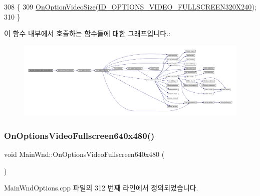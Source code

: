 \begin{DoxyCode}
308 \{
309   \mbox{\hyperlink{class_main_wnd_a3db1b6ad5af63ac2c3476868c015f6aa}{OnOptionVideoSize}}(\mbox{\hyperlink{resource_8h_ab637f5c65bbe48ce43c512478daa1491}{ID\_OPTIONS\_VIDEO\_FULLSCREEN320X240}});
310 \}
\end{DoxyCode}
이 함수 내부에서 호출하는 함수들에 대한 그래프입니다.\+:
\nopagebreak
\begin{figure}[H]
\begin{center}
\leavevmode
\includegraphics[width=350pt]{class_main_wnd_a6cdf116ca046f531f38d3d4ecb506f93_cgraph}
\end{center}
\end{figure}
\mbox{\label{class_main_wnd_ae205b52e438eb0305310ca81436967db}} 
\subsubsection{\texorpdfstring{On\+Options\+Video\+Fullscreen640x480()}{OnOptionsVideoFullscreen640x480()}}
{\footnotesize\ttfamily void Main\+Wnd\+::\+On\+Options\+Video\+Fullscreen640x480 (\begin{DoxyParamCaption}{ }\end{DoxyParamCaption})\hspace{0.3cm}{\ttfamily [protected]}}



Main\+Wnd\+Options.\+cpp 파일의 312 번째 라인에서 정의되었습니다.


